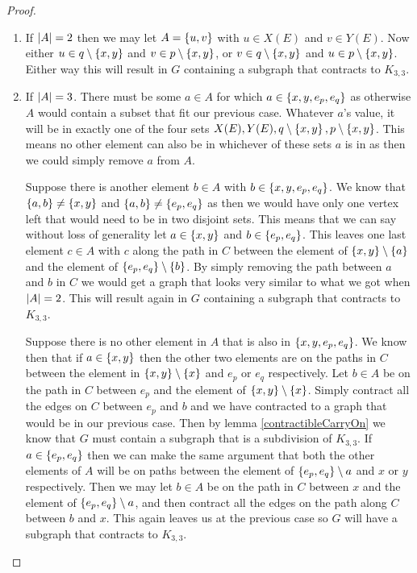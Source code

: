 \documentclass{article}
\begin{document}
\begin{proof}
	\begin{enumerate}
		\item If $\left| {A} \right| = 2$ then we may let $A = \left\{ {u,v} \right\}$ with $u\in X(E)$ and $v\in Y(E)$. Now either $u\in q\setminus\left\{ {x,y} \right\}$ and $v\in p\setminus\left\{ {x,y} \right\}$, or $v\in q\setminus\left\{ {x,y} \right\}$ and $u\in p\setminus\left\{ {x,y} \right\}$. Either way this will result in $G$ containing a subgraph that contracts to $K_{3,3}$.
		
		\item If $\left| {A} \right| = 3$. There must be some $a\in A$ for which $a\in\left\{ {x,y,e_p,e_q} \right\}$ as otherwise $A$ would contain a subset that fit our previous case. Whatever $a$'s value, it will be in exactly one of the four sets $X(E),Y(E),q\setminus\left\{ {x,y} \right\},p\setminus\left\{ {x,y} \right\}$. This means no other element can also be in whichever of these sets $a$ is in as then we could simply remove $a$ from $A$.
		
		
		Suppose there is another element $b\in A$ with $b \in\left\{ {x,y,e_p,e_q} \right\}$. We know that $\left\{ {a,b} \right\}\not=\left\{ {x,y} \right\}$ and $\left\{ {a,b} \right\}\not=\left\{ {e_p,e_q} \right\}$ as then we would have only one vertex left that would need to be in two disjoint sets. This means that we can say without loss of generality let $a \in\left\{ {x,y} \right\}$ and $b\in\left\{ {e_p,e_q} \right\}$. This leaves one last element $c\in A$ with $c$ along the path in $C$ between the element of $\left\{ {x,y} \right\}\setminus\left\{ {a} \right\}$ and the element of $\left\{ {e_p,e_q} \right\}\setminus\left\{ {b} \right\}$. By simply removing the path between $a$ and $b$ in $C$ we would get a graph that looks very similar to what we got when $\left| {A} \right| = 2$. This will result again in $G$ containing a subgraph that contracts to $K_{3,3}$.
		
		Suppose there is no other element in $A$ that is also in $\left\{ {x,y,e_p,e_q} \right\}$. We know then that if $a\in\left\{ {x,y} \right\}$ then the other two elements are on the paths in $C$ between the element in $\left\{ {x,y} \right\}\setminus\left\{ {x} \right\}$ and $e_p$ or $e_q$ respectively. Let $b\in A$ be on the path in $C$ between $e_p$ and the element of $\left\{ {x,y} \right\}\setminus\left\{ {x} \right\}$. Simply contract all the edges on $C$ between $e_p$ and $b$ and we have contracted to a graph that would be in our previous case. Then by lemma \ref{contractibleCarryOn} we know that $G$ must contain a subgraph that is a subdivision of $K_{3,3}$. If $a\in\left\{ {e_p,e_q} \right\}$ then we can make the same argument that both the other elements of $A$ will be on paths between the element of $\left\{ {e_p,e_q} \right\}\setminus a$ and $x$ or $y$ respectively. Then we may let $b\in A$ be on the path in $C$ between $x$ and the element of $\left\{ {e_p,e_q} \right\}\setminus a$, and then contract all the edges on the path along $C$ between $b$ and $x$. This again leaves us at the previous case so $G$ will have a subgraph that contracts to $K_{3,3}$.
		

\end{enumerate}
\end{proof}
\end{document}
